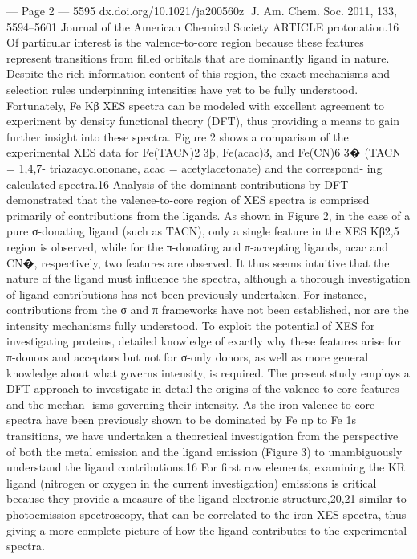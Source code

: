 --- Page 2 ---
5595
dx.doi.org/10.1021/ja200560z |J. Am. Chem. Soc. 2011, 133, 5594–5601
Journal of the American Chemical Society
ARTICLE
protonation.16 Of particular interest is the valence-to-core region
because these features represent transitions from ﬁlled orbitals that
are dominantly ligand in nature. Despite the rich information
content of this region, the exact mechanisms and selection rules
underpinning intensities have yet to be fully understood.
Fortunately, Fe Kβ XES spectra can be modeled with excellent
agreement to experiment by density functional theory (DFT),
thus providing a means to gain further insight into these spectra.
Figure 2 shows a comparison of the experimental XES data
for Fe(TACN)2
3þ, Fe(acac)3, and Fe(CN)6
3� (TACN = 1,4,7-
triazacyclononane, acac = acetylacetonate) and the correspond-
ing calculated spectra.16 Analysis of the dominant contributions
by DFT demonstrated that the valence-to-core region of XES
spectra is comprised primarily of contributions from the ligands.
As shown in Figure 2, in the case of a pure σ-donating ligand
(such as TACN), only a single feature in the XES Kβ2,5 region is
observed, while for the π-donating and π-accepting ligands, acac
and CN�, respectively, two features are observed. It thus seems
intuitive that the nature of the ligand must inﬂuence the spectra,
although a thorough investigation of ligand contributions has not
been previously undertaken. For instance, contributions from the
σ and π frameworks have not been established, nor are the
intensity mechanisms fully understood. To exploit the potential
of XES for investigating proteins, detailed knowledge of exactly
why these features arise for π-donors and acceptors but not
for σ-only donors, as well as more general knowledge about what
governs intensity, is required.
The present study employs a DFT approach to investigate in
detail the origins of the valence-to-core features and the mechan-
isms governing their intensity. As the iron valence-to-core
spectra have been previously shown to be dominated by Fe np
to Fe 1s transitions, we have undertaken a theoretical investigation
from the perspective of both the metal emission and the ligand
emission (Figure 3) to unambiguously understand the ligand
contributions.16 For ﬁrst row elements, examining the KR ligand
(nitrogen or oxygen in the current investigation) emissions is
critical because they provide a measure of the ligand electronic
structure,20,21 similar to photoemission spectroscopy, that can be
correlated to the iron XES spectra, thus giving a more complete
picture of how the ligand contributes to the experimental spectra.
